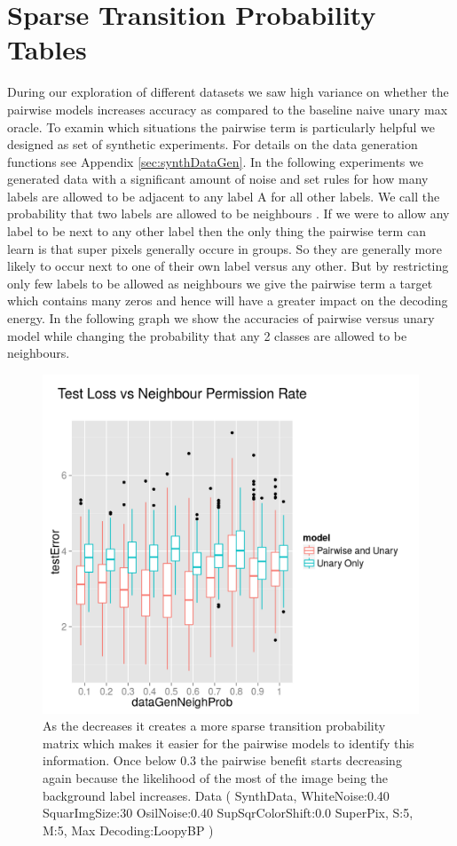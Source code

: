 \section{Sparse Transition Probability Tables}
During our exploration of different datasets we saw high variance on whether the pairwise models increases accuracy as compared to the baseline naive unary max oracle. To examin which situations the pairwise term is particularly helpful we designed as set of synthetic experiments. For details on the data generation functions see Appendix \ref{sec:synthDataGen}. In the following experiments we generated data with a significant amount of noise and set rules for how many labels are allowed to be adjacent to any label A for all other labels. We call the probability that two labels are allowed to be neighbours . If we were to allow any label to be next to any other label then the only thing the pairwise term can learn is that super pixels generally occure in groups. So they are generally more likely to occur next to one of their own label versus any other. But by restricting only few labels to be allowed as neighbours we give the pairwise term a target which contains many zeros and hence will have a greater impact on the decoding energy. In the following graph we show the accuracies of pairwise versus unary model while changing the probability that any 2 classes are allowed to be neighbours.

\begin{figure}[H]
\includegraphics[width=1\textwidth]{images/tesLoss_vs_Neighbour_permission.png}
  \caption { As the  decreases it creates a more sparse transition probability matrix which makes it easier for the pairwise models to identify this information. Once below 0.3 the pairwise benefit starts decreasing again because the likelihood of the most of the image being the background label increases. Data ( SynthData, WhiteNoise:0.40 SquarImgSize:30 OsilNoise:0.40 SupSqrColorShift:0.0 SuperPix, S:5, M:5, Max Decoding:LoopyBP ) } 
  \label{fig:neighprobVSloss}
\end{figure}

